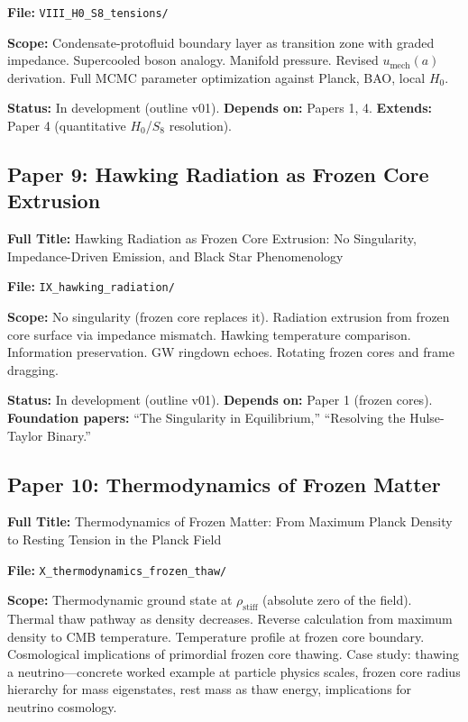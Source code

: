 \documentclass[11pt,a4paper]{article}
\newcommand{\rhostiff}{\ensuremath{\rho_{\mathrm{stiff}}}}
\begin{document}
\textbf{File:} \texttt{VIII\_H0\_S8\_tensions/}

\textbf{Scope:} Condensate-protofluid boundary layer as transition zone with graded impedance. Supercooled boson analogy. Manifold pressure. Revised $u_{\mathrm{mech}}(a)$ derivation. Full MCMC parameter optimization against Planck, BAO, local $H_0$.

\textbf{Status:} In development (outline v01). \quad \textbf{Depends on:} Papers 1, 4. \quad \textbf{Extends:} Paper 4 (quantitative $H_0$/$S_8$ resolution).

\subsection{Paper 9: Hawking Radiation as Frozen Core Extrusion}
\label{sec:paper9}

\textbf{Full Title:} Hawking Radiation as Frozen Core Extrusion: No Singularity, Impedance-Driven Emission, and Black Star Phenomenology

\textbf{File:} \texttt{IX\_hawking\_radiation/}

\textbf{Scope:} No singularity (frozen core replaces it). Radiation extrusion from frozen core surface via impedance mismatch. Hawking temperature comparison. Information preservation. GW ringdown echoes. Rotating frozen cores and frame dragging.

\textbf{Status:} In development (outline v01). \quad \textbf{Depends on:} Paper 1 (frozen cores). \quad \textbf{Foundation papers:} ``The Singularity in Equilibrium,'' ``Resolving the Hulse-Taylor Binary.''

\subsection{Paper 10: Thermodynamics of Frozen Matter}
\label{sec:paper10}

\textbf{Full Title:} Thermodynamics of Frozen Matter: From Maximum Planck Density to Resting Tension in the Planck Field

\textbf{File:} \texttt{X\_thermodynamics\_frozen\_thaw/}

\textbf{Scope:} Thermodynamic ground state at $\rhostiff$ (absolute zero of the field). Thermal thaw pathway as density decreases. Reverse calculation from maximum density to CMB temperature. Temperature profile at frozen core boundary. Cosmological implications of primordial frozen core thawing. Case study: thawing a neutrino---concrete worked example at particle physics scales, frozen core radius hierarchy for mass eigenstates, rest mass as thaw energy, implications for neutrino cosmology.
\end{document}
